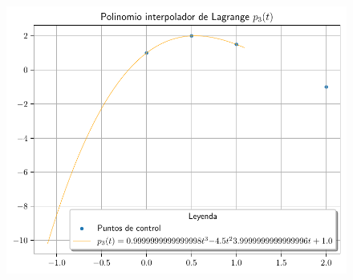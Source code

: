\begin{frame}
	\begin{solution}
		\begin{figure}[ht!]
			\centering
			\includegraphics[width=.72\paperwidth]{p7}
		\end{figure}
	\end{solution}
\end{frame}